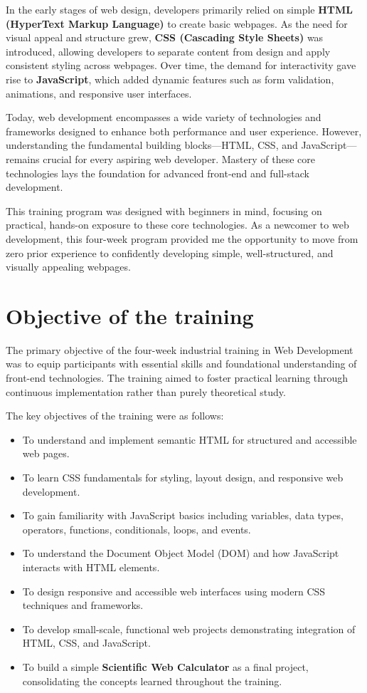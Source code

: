 \documentclass[a4paper,12pt,oneside]{report}
\numberwithin{equation}{chapter}
\numberwithin{figure}{chapter}
\numberwithin{table}{chapter}
\begin{document}
In the early stages of web design, developers primarily relied on simple \textbf{HTML (HyperText Markup Language)} to create basic webpages. As the need for visual appeal and structure grew, \textbf{CSS (Cascading Style Sheets)} was introduced, allowing developers to separate content from design and apply consistent styling across webpages. Over time, the demand for interactivity gave rise to \textbf{JavaScript}, which added dynamic features such as form validation, animations, and responsive user interfaces.

Today, web development encompasses a wide variety of technologies and frameworks designed to enhance both performance and user experience. However, understanding the fundamental building blocks—HTML, CSS, and JavaScript—remains crucial for every aspiring web developer. Mastery of these core technologies lays the foundation for advanced front-end and full-stack development. 

This training program was designed with beginners in mind, focusing on practical, hands-on exposure to these core technologies. As a newcomer to web development, this four-week program provided me the opportunity to move from zero prior experience to confidently developing simple, well-structured, and visually appealing webpages.

\section{Objective of the training}

The primary objective of the four-week industrial training in Web Development was to equip participants with essential skills and foundational understanding of front-end technologies. The training aimed to foster practical learning through continuous implementation rather than purely theoretical study.

The key objectives of the training were as follows:

\begin{itemize}
    \item To understand and implement semantic HTML for structured and accessible web pages.
    \item To learn CSS fundamentals for styling, layout design, and responsive web development.
    \item To gain familiarity with JavaScript basics including variables, data types, operators, functions, conditionals, loops, and events.
    \item To understand the Document Object Model (DOM) and how JavaScript interacts with HTML elements.
    \item To design responsive and accessible web interfaces using modern CSS techniques and frameworks.
    \item To develop small-scale, functional web projects demonstrating integration of HTML, CSS, and JavaScript.
    \item To build a simple \textbf{Scientific Web Calculator} as a final project, consolidating the concepts learned throughout the training.
\end{itemize}
\end{document}
